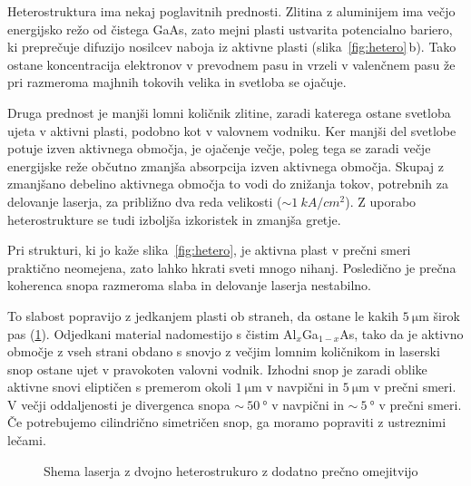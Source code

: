 Heterostruktura ima nekaj poglavitnih prednosti. Zlitina z aluminijem ima večjo 
energijsko režo od čistega GaAs, zato mejni plasti ustvarita potencialno bariero, 
ki preprečuje difuzijo nosilcev naboja iz aktivne plasti (slika~\ref{fig:hetero}\,b). Tako ostane koncentracija 
elektronov v prevodnem pasu in vrzeli v valenčnem pasu že pri razmeroma majhnih tokovih
velika in svetloba se ojačuje. 

Druga prednost je manjši lomni količnik zlitine, 
zaradi katerega ostane svetloba ujeta v aktivni plasti, podobno kot v valovnem 
vodniku. Ker manjši del svetlobe potuje izven aktivnega območja, je ojačenje večje,
poleg tega se zaradi večje energijske reže občutno zmanjša absorpcija izven aktivnega območja.
Skupaj z zmanjšano debelino aktivnega območja to vodi do znižanja tokov, 
potrebnih za delovanje laserja, za približno dva reda velikosti ($\sim 1~\si{kA}/\si{cm}^2$). 
Z uporabo heterostrukture se tudi izboljša izkoristek in zmanjša gretje.  

Pri strukturi, ki jo kaže slika~\ref{fig:hetero}, je aktivna plast v prečni smeri praktično neomejena, 
zato lahko hkrati sveti mnogo nihanj. Posledično je prečna koherenca snopa razmeroma slaba in 
delovanje laserja nestabilno. 

To slabost popravijo z jedkanjem plasti ob straneh, da ostane le
kakih $5~\si{\micro\meter}$ širok pas (\ref{fig:heshema}). Odjedkani material nadomestijo s čistim Al$_x$Ga$_{1-x}$As, 
tako da je aktivno območje z vseh strani obdano s snovjo z večjim lomnim količnikom in laserski
snop ostane ujet v pravokoten valovni vodnik. Izhodni snop je zaradi oblike aktivne snovi eliptičen s 
premerom okoli $1~\si{\micro\meter}$ v navpični in $5~\si{\micro\meter}$ v prečni smeri. 
V večji oddaljenosti je divergenca snopa $\sim~50~\si{\degree}$ v navpični in $\sim~5~\si{\degree}$ 
v prečni smeri. Če potrebujemo cilindrično simetričen snop, ga moramo popraviti z ustreznimi 
lečami.
\begin{figure}[ht]
\centering
\def\svgwidth{85truemm} 

\caption{Shema laserja z dvojno heterostrukuro z dodatno prečno omejitvijo
}
\label{fig:heshema}
\end{figure}

